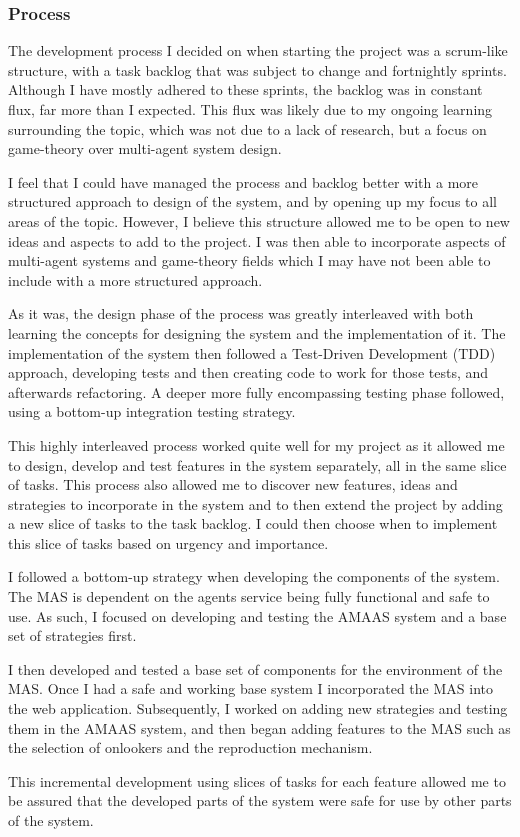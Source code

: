 \documentclass[]{final_report}
\begin{document}
\subsubsection{Process}
The development process I decided on when starting the project was a scrum-like structure, with a task backlog that was subject to change and fortnightly sprints. Although I have mostly adhered to these sprints, the backlog was in constant flux, far more than I expected. This flux was likely due to my ongoing learning surrounding the topic, which was not due to a lack of research, but a focus on game-theory over multi-agent system design.\par 
I feel that I could have managed the process and backlog better with a more structured approach to design of the system, and by opening up my focus to all areas of the topic. However, I believe this structure allowed me to be open to new ideas and aspects to add to the project. I was then able to incorporate aspects of multi-agent systems and game-theory fields which I may have not been able to include with a more structured approach.\par 
As it was, the design phase of the process was greatly interleaved with both learning the concepts for designing the system and the implementation of it. The implementation of the system then followed a Test-Driven Development (TDD) approach, developing tests and then creating code to work for those tests, and afterwards refactoring. A deeper more fully encompassing testing phase followed, using a bottom-up integration testing strategy.\par 
This highly interleaved process worked quite well for my project as it allowed me to design, develop and test features in the system separately, all in the same slice of tasks. This process also allowed me to discover new features, ideas and strategies to incorporate in the system and to then extend the project by adding a new slice of tasks to the task backlog. I could then choose when to implement this slice of tasks based on urgency and importance.\par 
I followed a bottom-up strategy when developing the components of the system. The MAS is dependent on the agents service being fully functional and safe to use. As such, I focused on developing and testing the AMAAS system and a base set of strategies first.\par 
I then developed and tested a base set of components for the environment of the MAS. Once I had a safe and working base system I incorporated the MAS into the web application. Subsequently, I worked on adding new strategies and testing them in the AMAAS system, and then began adding features to the MAS such as the selection of onlookers and the reproduction mechanism.\par 
This incremental development using slices of tasks for each feature allowed me to be assured that the developed parts of the system were safe for use by other parts of the system.
\end{document}
